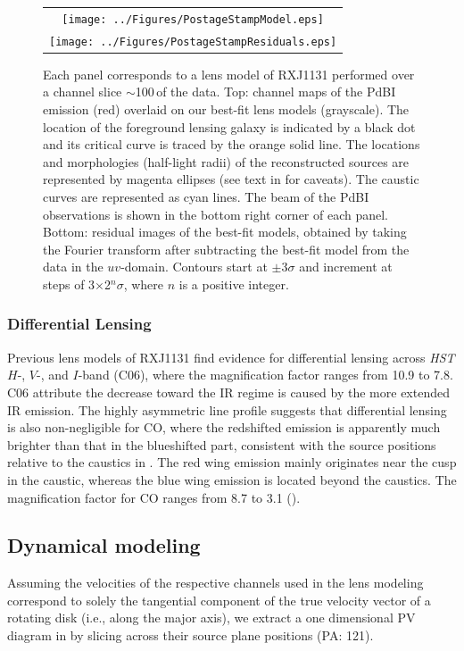 \documentclass[]{emulateapj}
\begin{document}
\begin{figure}[tbph]
\centering
\begin{tabular}{c}
\texttt{[image: ../Figures/PostageStampModel.eps]} \\
\texttt{[image: ../Figures/PostageStampResiduals.eps]}
\end{tabular}
\caption{Each panel corresponds to a lens model of RXJ1131 performed over a
channel slice $\sim$100\,\kms of the \bco data. Top: channel maps of the
PdBI \bco emission (red) overlaid on our best-fit lens models (grayscale).
The location of the foreground lensing galaxy is indicated by a black dot and
its critical curve is traced by the orange solid line. The locations and
morphologies (half-light radii) of the reconstructed sources are
represented by magenta ellipses (see text in  for caveats).
The caustic curves are represented as cyan lines. The beam of the
PdBI observations is shown in the bottom right corner of each panel.
Bottom: residual images of the best-fit models, obtained by
taking the Fourier transform after subtracting the best-fit model from the
data in the $uv$-domain. Contours start
at $\pm$3$\sigma$ and increment at steps of 3$\times$2$^n\sigma$,
where $n$ is a positive integer.
\label{fig:model}}
\end{figure}

\subsubsection{Differential Lensing} \label{sec:differential} %

Previous lens models of RXJ1131 find evidence for
differential lensing across {\it HST}
$H$-, $V$-, and $I$-band (C06), where the
magnification factor ranges from 10.9 to 7.8. C06 attribute
the decrease toward the IR regime is caused by the more extended
IR emission. The highly asymmetric \bco line profile suggests that
differential lensing is also non-negligible for CO, where the redshifted
emission is apparently much brighter than that in the
blueshifted part, consistent
with the source positions relative to the caustics in .
The red wing emission mainly originates near the cusp
in the caustic, whereas the blue wing emission is located beyond the caustics.
The magnification factor for CO ranges from 8.7 to 3.1 ().

\subsection{\bco Dynamical modeling} \label{sec:dynamics} %
Assuming the velocities of the respective channels used in the
lens modeling correspond to solely the tangential component of the
true velocity vector of a rotating disk (i.e., along the major axis),
we extract a one dimensional PV diagram in 
by slicing across their source plane positions (PA: 121\degr).
\end{document}
